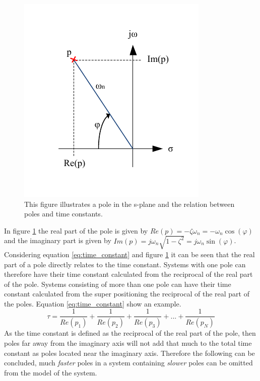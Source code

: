 \begin{figure}[htb]
	\begin{center}
	\includegraphics[scale=1,trim=0 0 0 0]{graphics/splane.pdf} %
	\caption{This figure illustrates a pole in the s-plane and the relation between poles and time constants.}
	\label{fig:s_plane}			%
	\end{center}
\end{figure}
In figure \ref{fig:s_plane} the real part of the pole is given by $Re(p) = - \zeta\omega_{n} = - \omega_{n} \cos(\varphi)$ and the imaginary part is given by $Im(p) = j\omega_{n}\sqrt{1 - \zeta^{2}} = j\omega_{n}\sin(\varphi)$. Considering equation \ref{eq:time_constant} and figure \ref{fig:s_plane} it can be seen that the real part of a pole directly relates to the time constant. Systems with one pole can therefore have their time constant calculated from the reciprocal of the real part of the pole. Systems consisting of more than one pole can have their time constant calculated from the super positioning the reciprocal of the real part of the poles. Equation \ref{eq:time_constant} show an example.
\begin{equation}
	\tau = \frac{1}{Re(p_{1})} + \frac{1}{Re(p_{2})} + \frac{1}{Re(p_{3})} + ... + \frac{1}{Re(p_{N})}\label{eq:time_constant}
\end{equation}
As the time constant is defined as the reciprocal of the real part of the pole, then poles far away from the imaginary axis will not add that much to the total time constant as poles located near the imaginary axis. Therefore the following can be concluded, much \textit{faster} poles in a system containing \textit{slower} poles can be omitted from the model of the system.

